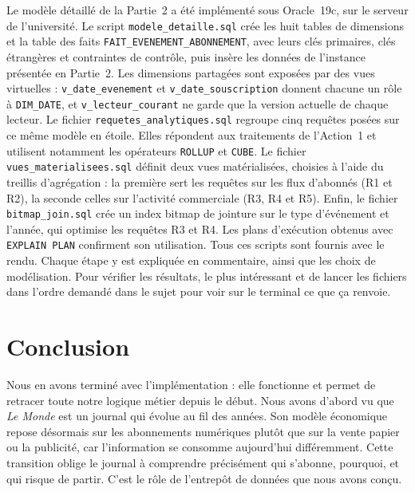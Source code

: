 \documentclass[a4paper,12pt]{article}
\begin{document}
Le modèle détaillé de la Partie~2 a été implémenté sous Oracle~19c, sur le
serveur de l'université. Le script \texttt{modele\_detaille.sql} crée les huit
tables de dimensions et la table des faits \texttt{FAIT\_EVENEMENT\_ABONNEMENT},
avec leurs clés primaires, clés étrangères et contraintes de contrôle, puis
insère les données de l'instance présentée en Partie~2.
Les dimensions partagées sont exposées par des vues virtuelles :
\texttt{v\_date\_evenement} et \texttt{v\_date\_souscription} donnent chacune
un rôle à \texttt{DIM\_DATE}, et \texttt{v\_lecteur\_courant} ne garde que la
version actuelle de chaque lecteur.
Le fichier \texttt{requetes\_analytiques.sql} regroupe cinq requêtes posées sur
ce même modèle en étoile. Elles répondent aux traitements de l'Action~1 et
utilisent notamment les opérateurs \texttt{ROLLUP} et \texttt{CUBE}.
Le fichier \texttt{vues\_materialisees.sql} définit deux vues matérialisées,
choisies à l'aide du treillis d'agrégation : la première sert les requêtes
sur les flux d'abonnés (R1 et R2), la seconde celles sur l'activité
commerciale (R3, R4 et R5).
Enfin, le fichier \texttt{bitmap\_join.sql} crée un index bitmap de jointure
sur le type d'événement et l'année, qui optimise les requêtes R3 et R4.
Les plans d'exécution obtenus avec \texttt{EXPLAIN PLAN} confirment son
utilisation.
Tous ces scripts sont fournis avec le rendu. Chaque étape y est expliquée en
commentaire, ainsi que les choix de modélisation. Pour vérifier les résultats, le plus intéressant et de lancer les fichiers dans l'ordre demandé dans le sujet pour voir sur le terminal ce que ça renvoie.

\newpage

\section*{Conclusion}

Nous en avons terminé avec l'implémentation : elle fonctionne et permet de
retracer toute notre logique métier depuis le début. Nous avons d'abord vu
que \emph{Le Monde} est un journal qui évolue au fil des années. Son modèle
économique repose désormais sur les abonnements numériques plutôt que sur
la vente papier ou la publicité, car l'information se consomme aujourd'hui
différemment. Cette transition oblige le journal à comprendre précisément
qui s'abonne, pourquoi, et qui risque de partir. C'est le rôle de
l'entrepôt de données que nous avons conçu.
\end{document}
